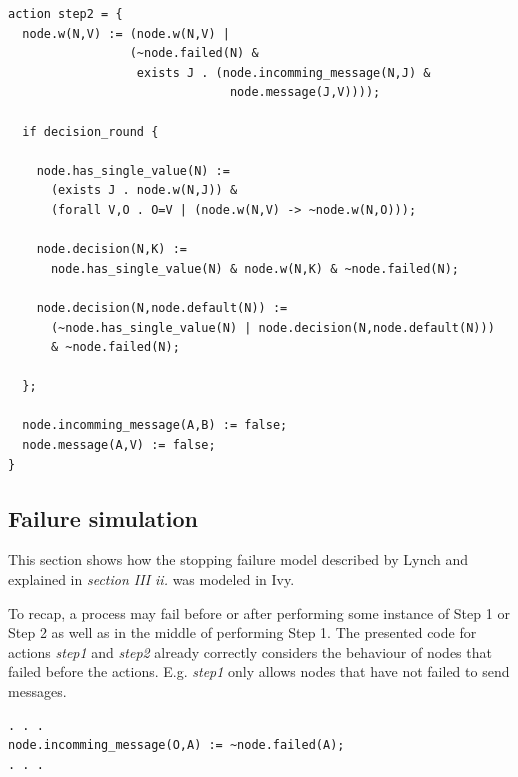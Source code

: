 \documentclass[fleqn]{article}
\begin{document}
\begin{mdframed}[nobreak=true, backgroundcolor=light-gray, roundcorner=10pt,leftmargin=1, rightmargin=1, innerleftmargin=15, innertopmargin=15,innerbottommargin=15, outerlinewidth=1, linecolor=light-gray]
\begin{lstlisting}
action step2 = {
  node.w(N,V) := (node.w(N,V) |
                 (~node.failed(N) &
                  exists J . (node.incomming_message(N,J) &
                               node.message(J,V))));

  if decision_round {

    node.has_single_value(N) :=
      (exists J . node.w(N,J)) &
      (forall V,O . O=V | (node.w(N,V) -> ~node.w(N,O)));

    node.decision(N,K) :=
      node.has_single_value(N) & node.w(N,K) & ~node.failed(N);

    node.decision(N,node.default(N)) :=
      (~node.has_single_value(N) | node.decision(N,node.default(N)))
      & ~node.failed(N);

  };

  node.incomming_message(A,B) := false;
  node.message(A,V) := false;
}
\end{lstlisting}
\end{mdframed}

\subsection{Failure simulation}


This section shows how the stopping failure model described by Lynch \cite{refNancy} and explained in \textit{section III ii.} was modeled in Ivy.

To recap, a process may fail before or after performing some instance of Step 1 or Step 2 as well as in the middle of performing Step 1.  The presented code for actions \textit{step1} and \textit{step2} already correctly considers the behaviour of nodes that failed before the actions. E.g. \textit{step1} only allows nodes that have not failed to send messages.
\begin{mdframed}[nobreak=true, backgroundcolor=light-gray, roundcorner=10pt,leftmargin=1, rightmargin=1, innerleftmargin=15, innertopmargin=15,innerbottommargin=15, outerlinewidth=1, linecolor=light-gray]
\begin{lstlisting}
. . .
node.incomming_message(O,A) := ~node.failed(A);
. . .
\end{lstlisting}
\end{mdframed}
\end{document}

